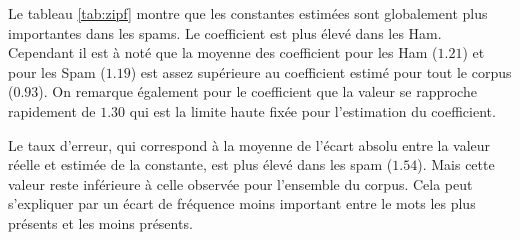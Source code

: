 \documentclass[a4paper,12pt]{article}
\begin{document}
							\begin{table}[H]
					\centering
					 \label{tab:zipf}
				\end{table}
				Le tableau \ref{tab:zipf} montre que les constantes estimées sont globalement plus importantes dans les spams. Le coefficient est plus élevé dans les Ham. Cependant il est à noté que la moyenne des coefficient pour les Ham ($1.21$) et pour les Spam ($1.19$) est assez supérieure au coefficient estimé pour tout le corpus ($0.93$). On remarque également pour le coefficient que la valeur se rapproche rapidement de $1.30$ qui est la limite haute fixée pour l'estimation du coefficient. 
				
				Le taux d'erreur, qui correspond à la moyenne de l'écart absolu entre la valeur réelle et estimée de la constante, est plus élevé dans les spam ($1.54$). Mais cette valeur reste inférieure à celle observée  pour l'ensemble du corpus. Cela peut s'expliquer par un écart de fréquence moins important entre le mots les plus présents et les moins présents.
				
\end{document}
